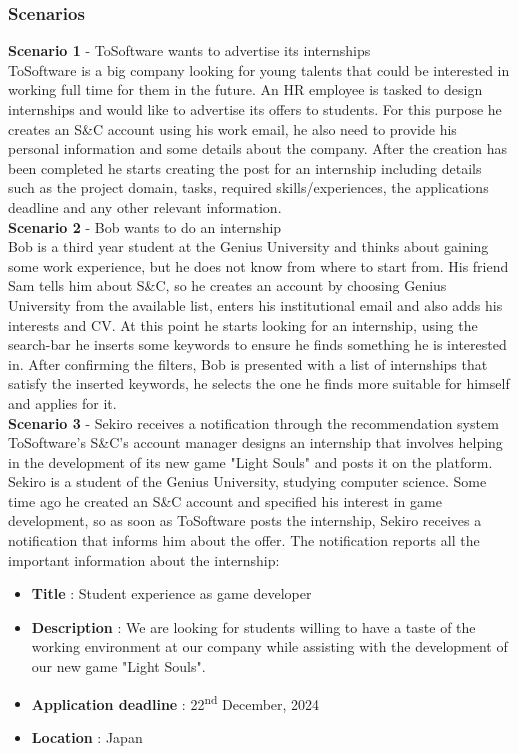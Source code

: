 \documentclass[11pt,twoside]{article}
\begin{document}
		\subsubsection{Scenarios}
\textbf{\large{Scenario 1}} - ToSoftware wants to advertise its internships \\
ToSoftware is a big company looking for young talents that could be interested in working full time for them in the future. An HR employee is tasked to design internships and would like to advertise its offers to students. For this purpose he creates an S\&C account using his work email, he also need to provide his personal information and some details about the company. After the creation has been completed he starts creating the post for an internship including details such as the project domain, tasks, required skills/experiences, the applications deadline and any other relevant information.
\vspace{1\baselineskip} \\
\textbf{\large{Scenario 2}} - Bob wants to do an internship \\
Bob is a third year student at the Genius University and thinks about gaining some work experience, but he does not know from where to start from. His friend Sam tells him about S\&C, so he creates an account by choosing Genius University from the available list, enters his institutional email and also adds his interests and CV. At this point he starts looking for an internship, using the search-bar he inserts some keywords to ensure he finds something he is interested in. After confirming the filters, Bob is presented with a list of internships that satisfy the inserted keywords, he selects the one he finds more suitable for himself and applies for it.
\vspace{1\baselineskip} \\
\textbf{\large{Scenario 3}} - Sekiro receives a notification through the recommendation system \\
ToSoftware's S\&C's account manager designs an internship that involves helping in the development of its new game "Light Souls" and posts it on the platform. Sekiro is a student of the Genius University, studying computer science. Some time ago he created an S\&C account and specified his interest in game development, so as soon as ToSoftware posts the internship, Sekiro receives a notification that informs him about the offer. The notification reports all the important information about the internship:
\begin{itemize}
\item[] \textbf{Title} : Student experience as game developer
\item[] \textbf{Description} : We are looking for students willing to have a taste of the working environment at our company while assisting with the development of our new game "Light Souls".
\item[] \textbf{Application deadline} : 22\textsuperscript{nd} December, 2024
\item[] \textbf{Location} : Japan
\end{itemize}
\end{document}
